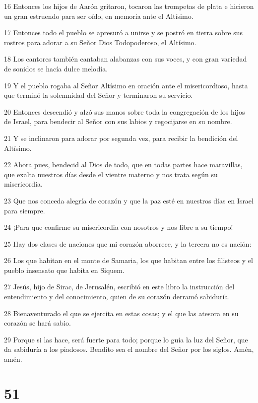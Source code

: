 \par 16 Entonces los hijos de Aarón gritaron, tocaron las trompetas de plata e hicieron un gran estruendo para ser oído, en memoria ante el Altísimo.
\par 17 Entonces todo el pueblo se apresuró a unirse y se postró en tierra sobre sus rostros para adorar a su Señor Dios Todopoderoso, el Altísimo.
\par 18 Los cantores también cantaban alabanzas con sus voces, y con gran variedad de sonidos se hacía dulce melodía.
\par 19 Y el pueblo rogaba al Señor Altísimo en oración ante el misericordioso, hasta que terminó la solemnidad del Señor y terminaron su servicio.
\par 20 Entonces descendió y alzó sus manos sobre toda la congregación de los hijos de Israel, para bendecir al Señor con sus labios y regocijarse en su nombre.
\par 21 Y se inclinaron para adorar por segunda vez, para recibir la bendición del Altísimo.
\par 22 Ahora pues, bendecid al Dios de todo, que en todas partes hace maravillas, que exalta nuestros días desde el vientre materno y nos trata según su misericordia.
\par 23 Que nos conceda alegría de corazón y que la paz esté en nuestros días en Israel para siempre.
\par 24 ¡Para que confirme su misericordia con nosotros y nos libre a su tiempo!
\par 25 Hay dos clases de naciones que mi corazón aborrece, y la tercera no es nación:
\par 26 Los que habitan en el monte de Samaria, los que habitan entre los filisteos y el pueblo insensato que habita en Siquem.
\par 27 Jesús, hijo de Sirac, de Jerusalén, escribió en este libro la instrucción del entendimiento y del conocimiento, quien de su corazón derramó sabiduría.
\par 28 Bienaventurado el que se ejercita en estas cosas; y el que las atesora en su corazón se hará sabio.
\par 29 Porque si las hace, será fuerte para todo; porque lo guía la luz del Señor, que da sabiduría a los piadosos. Bendito sea el nombre del Señor por los siglos. Amén, amén.

\chapter{51}

